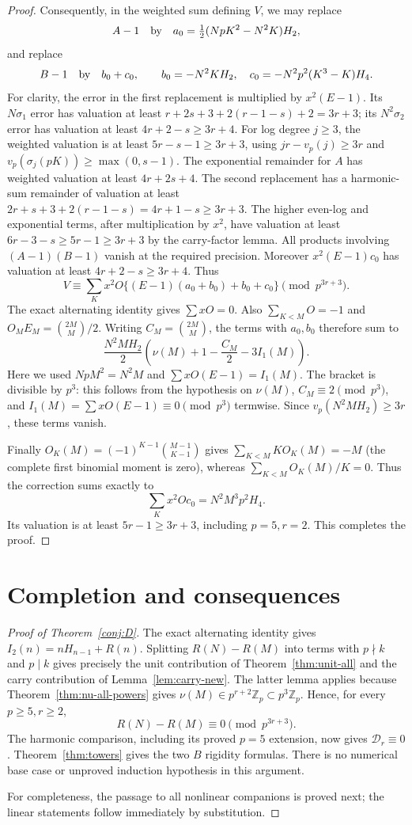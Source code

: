 \documentclass[11pt]{amsart}
\theoremstyle{definition}
\theoremstyle{remark}
\begin{document}
\begin{proof}
Consequently, in the weighted sum defining $V$, we may replace
\[
 A-1\quad\hbox{by}\quad a_0=\tfrac12(NpK^2-N^2K)H_2,
\]
and replace
\[
 B-1\quad\hbox{by}\quad b_0+c_0,
 \qquad b_0=-N^2KH_2,\quad c_0=-N^2p^2(K^3-K)H_4.
\]
For clarity, the error in the first replacement is multiplied by $x^2(E-1)$.
Its $N\sigma_1$ error has valuation at least
$r+2s+3+2(r-1-s)+2=3r+3$;
its $N^2\sigma_2$ error has valuation at least $4r+2-s\ge3r+4$.
For log degree $j\ge3$, the weighted valuation is at least
$5r-s-1\ge3r+3$, using $jr-v_p(j)\ge3r$ and
$v_p(\sigma_j(pK))\ge\max(0,s-1)$. The exponential remainder
for $A$ has weighted valuation at least $4r+2s+4$.
The second replacement has a harmonic-sum remainder of valuation at least
$2r+s+3+2(r-1-s)=4r+1-s\ge3r+3$.
The higher even-log and exponential terms, after multiplication by
$x^2$, have valuation at least $6r-3-s\ge5r-1\ge3r+3$
by the carry-factor lemma.
All products involving $(A-1)(B-1)$ vanish at the required precision.
Moreover $x^2(E-1)c_0$ has valuation at least $4r+2-s\ge3r+4$.
Thus
\[
 V\equiv\sum_Kx^2O\{(E-1)(a_0+b_0)+b_0+c_0\}
 \pmod{p^{3r+3}}.
\]
The exact alternating identity gives $\sum xO=0$.
Also $\sum_{K<M}O=-1$ and $O_ME_M=\binom{2M}{M}/2$.
Writing $C_M=\binom{2M}{M}$, the terms with $a_0,b_0$ therefore sum to
\[
 \frac{N^2MH_2}{2}\left(\nu(M)+1-\frac{C_M}{2}-3I_1(M)\right).
\]
Here we used $NpM^2=N^2M$ and
$\sum xO(E-1)=I_1(M)$.
The bracket is divisible by $p^3$: this follows from the hypothesis on $\nu(M)$,
$C_M\equiv2\pmod{p^3}$, and
$I_1(M)=\sum xO(E-1)\equiv0\pmod{p^3}$ termwise.
Since $v_p(N^2MH_2)\ge3r$, these terms vanish.

Finally $O_K(M)=(-1)^{K-1}\binom{M-1}{K-1}$ gives
$\sum_{K<M}K O_K(M)=-M$ (the complete first binomial moment is zero),
whereas $\sum_{K<M}O_K(M)/K=0$.
Thus the correction sums exactly to
\[
 \sum_Kx^2O c_0=N^2M^3p^2H_4.
\]
Its valuation is at least $5r-1\ge3r+3$, including $p=5,r=2$.
This completes the proof.
\end{proof}


\section{Completion and consequences}\label{sec:completion}
\begin{proof}[Proof of Theorem~\ref{conj:D}]
The exact alternating identity gives $I_2(n)=nH_{n-1}+R(n)$.
Splitting $R(N)-R(M)$ into terms with $p\nmid k$ and $p\mid k$
gives precisely the unit contribution of Theorem~\ref{thm:unit-all}
and the carry contribution of Lemma~\ref{lem:carry-new}.
The latter lemma applies because Theorem~\ref{thm:nu-all-powers}
gives $\nu(M)\in p^{r+2}\mathbb Z_p\subset p^3\mathbb Z_p$.
Hence, for every $p\ge5,r\ge2$,
\[
R(N)-R(M)\equiv0\pmod{p^{3r+3}}.
\]
The harmonic comparison, including its proved $p=5$ extension,
now gives $\mathcal D_r\equiv0$. Theorem~\ref{thm:towers} gives
the two $B$ rigidity formulas. There is no numerical base case or
unproved induction hypothesis in this argument.

For completeness, the passage to all nonlinear companions is
proved next; the linear statements follow immediately by substitution.
\end{proof}
\end{document}
